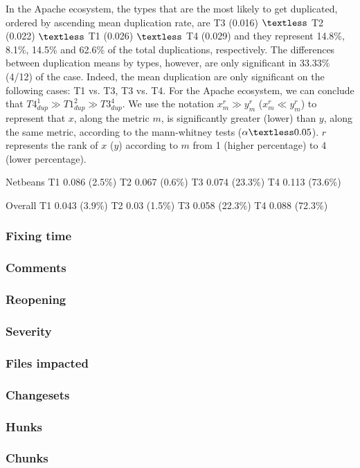 In the Apache ecosystem, the types that are the most likely to get duplicated, ordered by ascending mean duplication rate, are T3 (0.016) $\textless$ T2 (0.022) $\textless$ T1 (0.026) $\textless$ T4 (0.029) and they represent 14.8\%, 8.1\%, 14.5\% and 62.6\% of the total duplications, respectively.
The differences between duplication means by types, however, are only significant in 33.33\% (4/12) of the case.
Indeed, the mean duplication are only significant on the following cases: T1 vs. T3, T3 vs. T4.
For the Apache ecosystem, we can conclude that $T4_{dup}^1 \gg T1_{dup}^2 \gg T3_{dup}^4$.
We use the notation  $x_{m}^r \gg y_{m}^r$ ($x_{m}^r \ll y_{m}^r$) to represent that $x$, along the metric $m$, is significantly greater (lower) than $y$, along the same metric, according to the mann-whitney tests ($\alpha \textless 0.05$).
$r$ represents the rank of $x$ ($y$) according to $m$ from 1 (higher percentage) to 4 (lower percentage).





Netbeans T1 0.086 (2.5\%) T2 0.067 (0.6\%) T3 0.074 (23.3\%) T4 0.113 (73.6\%)

Overall T1 0.043 (3.9\%) T2 0.03 (1.5\%) T3 0.058 (22.3\%) T4 0.088 (72.3\%)

\subsubsection{Fixing time}
\subsubsection{Comments}
\subsubsection{Reopening}
\subsubsection{Severity}
\subsubsection{Files impacted}
\subsubsection{Changesets}
\subsubsection{Hunks}
\subsubsection{Chunks}










